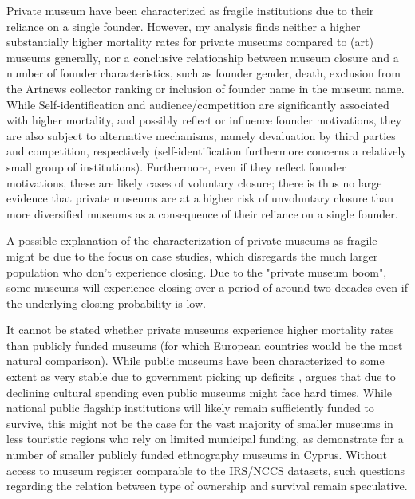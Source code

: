 \documentclass[12pt]{article}
\begin{document}
Private museum have been characterized as fragile institutions due to their reliance on a single founder.
However, my analysis finds neither a higher substantially higher mortality rates for private museums compared to (art) museums generally, nor a conclusive relationship between museum closure and a number of founder characteristics, such as founder gender, death, exclusion from the Artnews collector ranking or inclusion of founder name in the museum name.
While Self-identification and audience/competition are significantly associated with higher mortality, and possibly reflect or influence founder motivations, they are also subject to alternative mechanisms, namely devaluation by third parties and competition, respectively (self-identification furthermore concerns a relatively small group of institutions).
Furthermore, even if they reflect founder motivations, these are likely cases of voluntary closure; there is thus no large evidence that private museums are at a higher risk of unvoluntary closure than more diversified museums as a consequence of their reliance on a single founder. 



A possible explanation of the characterization of private museums as fragile might be due to the focus on case studies, which disregards the much larger population who don't experience closing.
Due to the "private museum boom", some museums will experience closing over a period of around two decades even if the underlying closing probability is low.





It cannot be stated whether private museums experience higher mortality rates than publicly funded museums (for which European countries would be the most natural comparison).
While public museums have been characterized to some extent as very stable due to government picking up deficits \parencite{Meier_Frey_2003_faces,Bechtler_Imhof_2018_future}, \textcite{Walker_2019_collector} argues that due to declining cultural spending even public museums might face hard times.
While national public flagship institutions will likely remain sufficiently funded to survive, this might not be the case for the vast majority of smaller museums in less touristic regions who rely on limited municipal funding, as \textcite{StylianouLambert_etal_2014_museums} demonstrate for a number of smaller publicly funded ethnography museums in Cyprus.
Without access to museum register comparable to the IRS/NCCS datasets, such questions regarding the relation between type of ownership and survival remain speculative.
\end{document}
